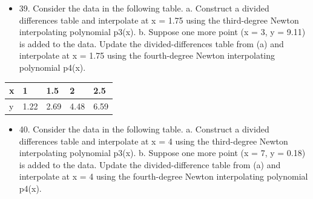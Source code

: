 \documentclass{article}
\begin{document}
\begin{itemize}
    \item 39. Consider the data in the following table.
          \newline  a. Construct a divided differences table and interpolate at x = 1.75
          using the third-degree Newton interpolating polynomial p3(x).
          \newline  b. Suppose one more point (x = 3, y = 9.11) is added to the data.
          Update the divided-differences table from (a) and interpolate at
          x = 1.75 using the fourth-degree Newton interpolating polynomial
          p4(x).
\end{itemize}

\begin{table}[h!]
    \begin{tabular}{l|l|l|l|l}
        \hline
        \multicolumn{1}{|p{30.865313pt}}{\raggedright x} & \multicolumn{1}{|p{30.865313pt}}{\raggedright 1}    & \multicolumn{1}{|p{32.370937pt}}{\raggedright 1.5}  & \multicolumn{1}{|p{30.1125pt}}{\raggedright 2}    & \multicolumn{1}{|p{30.1125pt}|}{\raggedright 2.5}  \\
        \hline
        \multicolumn{1}{|p{30.865313pt}}{\raggedright y} & \multicolumn{1}{|p{30.865313pt}}{\raggedright 1.22} & \multicolumn{1}{|p{32.370937pt}}{\raggedright 2.69} & \multicolumn{1}{|p{30.1125pt}}{\raggedright 4.48} & \multicolumn{1}{|p{30.1125pt}|}{\raggedright 6.59} \\
        \hline
    \end{tabular}
\end{table}

\begin{itemize}
    \item 40. Consider the data in the following table.
          \newline  a. Construct a divided differences table and interpolate at x = 4
          using the third-degree Newton interpolating polynomial p3(x).
          \newline  b. Suppose one more point (x = 7, y = 0.18) is added to the data.
          Update the divided-difference table from (a) and interpolate at
          x = 4 using the fourth-degree Newton interpolating polynomial
          p4(x).
\end{itemize}
\end{document}
